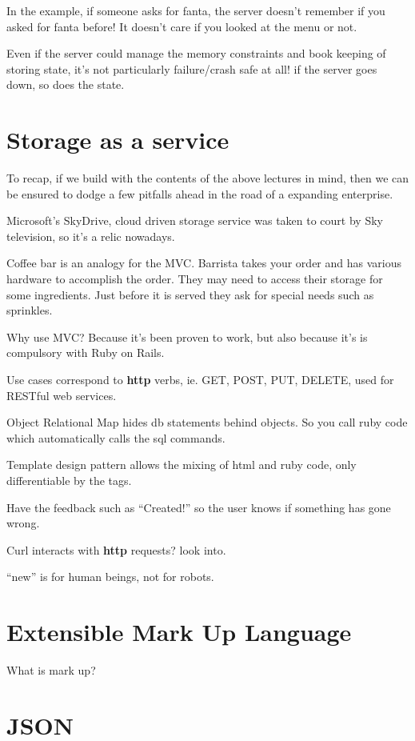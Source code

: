 \documentclass[11pt]{article}
\begin{document}
In the example, if someone asks for fanta, the server doesn’t remember if you asked for fanta before! It doesn’t care if you looked at the menu or not.

Even if the server could manage the memory constraints and book keeping of storing state, it’s not particularly failure/crash safe at all! if the server goes down, so does the state.

\section{Storage as a service}

To recap, if we build with the contents of the above lectures in mind, then we can be ensured to dodge a few pitfalls ahead in the road of a expanding enterprise.

Microsoft’s SkyDrive, cloud driven storage service was taken to court by Sky television, so it’s a relic nowadays.

Coffee bar is an analogy for the MVC. Barrista takes your order and has various hardware to accomplish the order. They may need to access their storage for some ingredients. Just before it is served they ask for special needs such as sprinkles.

Why use MVC? Because it’s been proven to work, but also because it’s is compulsory with Ruby on Rails.

Use cases correspond to \textbf{http} verbs, ie. GET, POST, PUT, DELETE, used for RESTful web services.

Object Relational Map hides db statements behind objects. So you call ruby code which automatically calls the sql commands.

Template design pattern allows the mixing of html and ruby code, only differentiable by the tags.

Have the feedback such as “Created!” so the user knows if something has gone wrong.

Curl interacts with \textbf{http} requests? look into.

“new” is for human beings, not for robots.

\section{Extensible Mark Up Language}

What is mark up?

\section{JSON}
\end{document}
